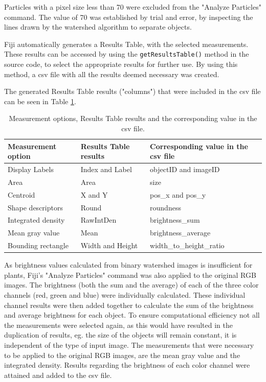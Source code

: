 \documentclass[paper=A4,bibliography=totocnumbered]{scrartcl}
\begin{document}
Particles with a pixel size less than 70 were excluded from the "Analyze Particles" command. The value of 70 was established by trial and error, by inspecting the lines drawn by the watershed algorithm to separate objects.

Fiji automatically generates a Results Table, with the selected measurements. These results can be accessed by using the \texttt{getResultsTable()} method in the source code, to select the appropriate results for further use. By using this method, a csv file with all the results deemed necessary was created. 

The generated Results Table results ("columns") that were included in the csv file can be seen in Table \ref{tab:result_table}.

\begin{table}[htbp]
	\centering
	\caption{Measurement options, Results Table results and the corresponding value in the csv file.}
	\begin{tabular}{lll}
		\toprule
		Measurement option & Results Table results  & Corresponding value in the csv file \\
		\midrule
		 Display Labels & Index and Label & objectID and imageID\\
		Area & Area & size\\
		Centroid & X and Y & pos\_x and pos\_y\\
		Shape descriptors & Round & roundness\\
        Integrated density & RawIntDen & brightness\_sum\\
      	Mean gray value & Mean & brightness\_average\\
       	Bounding rectangle & Width and Height & width\_to\_height\_ratio\\
        \bottomrule
	\end{tabular}
	\label{tab:result_table}
\end{table}

As brightness values calculated from binary watershed images is insufficient for plants, Fiji's "Analyze Particles" command was also applied to the original RGB images. The brightness (both the sum and the average) of each of the three color channels (red, green and blue) were individually calculated. These individual channel results were then added together to calculate the sum of the brightness and average brightness for each object. To ensure computational efficiency not all the measurements were selected again, as this would have resulted in the duplication of results, eg. the size of the objects will remain constant, it is independent of the type of input image. The measurements that were necessary to be applied to the original RGB images, are the mean gray value and the integrated density. Results regarding the brightness of each color channel were attained and added to the csv file. 
\end{document}
